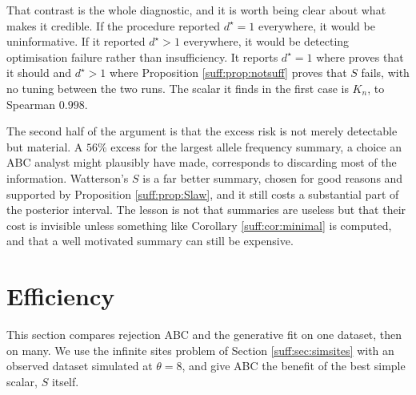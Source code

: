 That contrast is the whole diagnostic, and it is worth being clear about what makes it
credible. If the procedure reported $d^\star=1$ everywhere, it would be uninformative. If it
reported $d^\star>1$ everywhere, it would be detecting optimisation failure rather than
insufficiency. It reports $d^\star=1$ where \citet{suff:ewens1972} proves that it should and
$d^\star>1$ where Proposition \ref{suff:prop:notsuff} proves that $S$ fails, with no tuning
between the two runs. The scalar it finds in the first case is $K_n$, to Spearman $0.998$.

The second half of the argument is that the excess risk is not merely detectable but
material. A $56\%$ excess for the largest allele frequency summary, a choice an ABC analyst
might plausibly have made, corresponds to discarding most of the information. Watterson's $S$
is a far better summary, chosen for good reasons and supported by Proposition
\ref{suff:prop:Slaw}, and it still costs a substantial part of the posterior interval. The
lesson is not that summaries are useless but that their cost is invisible unless something
like Corollary \ref{suff:cor:minimal} is computed, and that a well motivated summary can still
be expensive.

\section{Efficiency}
\label{suff:sec:eff}

This section compares rejection ABC and the generative fit on one dataset, then on many. We
use the infinite sites problem of Section \ref{suff:sec:simsites} with an observed dataset
simulated at $\theta=8$, and give ABC the benefit of the best simple scalar, $S$ itself.

